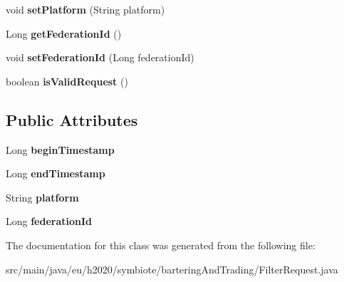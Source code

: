 \begin{DoxyCompactItemize}
void {\bfseries set\+Platform} (String platform)
\item 
\mbox{\label{classeu_1_1h2020_1_1symbiote_1_1barteringAndTrading_1_1FilterRequest_a61279a31545fe5b501eddf7d723a7d84}} 
Long {\bfseries get\+Federation\+Id} ()
\item 
\mbox{\label{classeu_1_1h2020_1_1symbiote_1_1barteringAndTrading_1_1FilterRequest_a157aaa39636455a528e627bfdf3b7107}} 
void {\bfseries set\+Federation\+Id} (Long federation\+Id)
\item 
\mbox{\label{classeu_1_1h2020_1_1symbiote_1_1barteringAndTrading_1_1FilterRequest_afa25343b853e003f315327282a865cd6}} 
boolean {\bfseries is\+Valid\+Request} ()
\end{DoxyCompactItemize}
\subsection*{Public Attributes}
\begin{DoxyCompactItemize}
\item 
\mbox{\label{classeu_1_1h2020_1_1symbiote_1_1barteringAndTrading_1_1FilterRequest_a28d19aa7db8c8a95ca0a7393240fad29}} 
Long {\bfseries begin\+Timestamp}
\item 
\mbox{\label{classeu_1_1h2020_1_1symbiote_1_1barteringAndTrading_1_1FilterRequest_a158000ed6c08d69e85c6247229a8f518}} 
Long {\bfseries end\+Timestamp}
\item 
\mbox{\label{classeu_1_1h2020_1_1symbiote_1_1barteringAndTrading_1_1FilterRequest_a688387f03cccee7b4c013e4308c7b890}} 
String {\bfseries platform}
\item 
\mbox{\label{classeu_1_1h2020_1_1symbiote_1_1barteringAndTrading_1_1FilterRequest_ada0710e478a4f669b83894f8bf0d7674}} 
Long {\bfseries federation\+Id}
\end{DoxyCompactItemize}


The documentation for this class was generated from the following file\+:\begin{DoxyCompactItemize}
\item 
src/main/java/eu/h2020/symbiote/bartering\+And\+Trading/Filter\+Request.\+java\end{DoxyCompactItemize}
